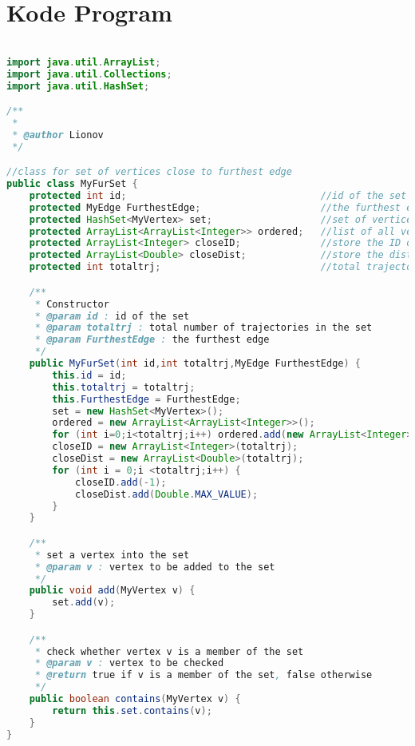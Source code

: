 \chapter{Kode Program}
\label{lamp:A}

\singlespacing 
%
%
\begin{lstlisting}[language=Java,basicstyle=\tiny,caption=MyFurSet.java]

import java.util.ArrayList;
import java.util.Collections;
import java.util.HashSet; 

/**
 *
 * @author Lionov
 */

//class for set of vertices close to furthest edge
public class MyFurSet {
    protected int id;                                  //id of the set
    protected MyEdge FurthestEdge;                     //the furthest edge
    protected HashSet<MyVertex> set;                   //set of vertices close to furthest edge
    protected ArrayList<ArrayList<Integer>> ordered;   //list of all vertices in the set for each trajectory
    protected ArrayList<Integer> closeID;              //store the ID of all vertices
    protected ArrayList<Double> closeDist;             //store the distance of all vertices
    protected int totaltrj;                            //total trajectories in the set

    /**
     * Constructor
     * @param id : id of the set
     * @param totaltrj : total number of trajectories in the set
     * @param FurthestEdge : the furthest edge
     */
    public MyFurSet(int id,int totaltrj,MyEdge FurthestEdge) {
        this.id = id;
        this.totaltrj = totaltrj;
        this.FurthestEdge = FurthestEdge;
        set = new HashSet<MyVertex>();
        ordered = new ArrayList<ArrayList<Integer>>();
        for (int i=0;i<totaltrj;i++) ordered.add(new ArrayList<Integer>());
        closeID = new ArrayList<Integer>(totaltrj);
        closeDist = new ArrayList<Double>(totaltrj);
        for (int i = 0;i <totaltrj;i++) {
            closeID.add(-1);
            closeDist.add(Double.MAX_VALUE);
        }
    }

    /**
     * set a vertex into the set
     * @param v : vertex to be added to the set
     */
    public void add(MyVertex v) {
        set.add(v);
    }

    /**
     * check whether vertex v is a member of the set
     * @param v : vertex to be checked
     * @return true if v is a member of the set, false otherwise
     */
    public boolean contains(MyVertex v) {
        return this.set.contains(v);
    }
}
\end{lstlisting}

